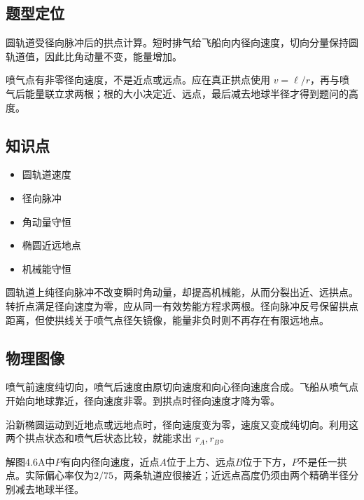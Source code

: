 \documentclass[UTF8,fontset=fandol,a4paper,11pt]{ctexart}
\providecommand{\tightlist}{\setlength{\itemsep}{0pt}\setlength{\parskip}{0pt}}
\begin{document}


\subsection*{题型定位}

圆轨道受径向脉冲后的拱点计算。短时排气给飞船向内径向速度，切向分量保持圆轨道值，因此比角动量不变，能量增加。

喷气点有非零径向速度，不是近点或远点。应在真正拱点使用
\(v=\ell/r\)，再与喷气后能量联立求两根；根的大小决定近、远点，最后减去地球半径才得到题问的高度。



\subsection*{知识点}

\begin{itemize}
\tightlist
\item
  圆轨道速度
\item
  径向脉冲
\item
  角动量守恒
\item
  椭圆近远地点
\item
  机械能守恒
\end{itemize}

圆轨道上纯径向脉冲不改变瞬时角动量，却提高机械能，从而分裂出近、远拱点。转折点满足径向速度为零，应从同一有效势能方程求两根。径向脉冲反号保留拱点距离，但使拱线关于喷气点径矢镜像，能量非负时则不再存在有限远地点。




\subsection*{物理图像}

喷气前速度纯切向，喷气后速度由原切向速度和向心径向速度合成。飞船从喷气点开始向地球靠近，径向速度非零。到拱点时径向速度才降为零。

沿新椭圆运动到近地点或远地点时，径向速度变为零，速度又变成纯切向。利用这两个拱点状态和喷气后状态比较，就能求出
\(r_A,r_B\)。

解图4.6A中$P$有向内径向速度，近点$A$位于上方、远点$B$位于下方，$P$不是任一拱点。实际偏心率仅为$2/75$，两条轨道应很接近；近远点高度仍须由两个精确半径分别减去地球半径。
\end{document}
